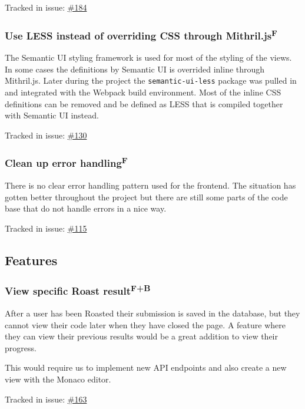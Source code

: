 \documentclass[12pt,a4paper]{report}
\begin{document}
Tracked in issue: \href{https://github.com/LuleaUniversityOfTechnology/2018-project-roaster/issues/184}{\#184}

\subsubsection{Use LESS instead of overriding CSS through Mithril.js\texorpdfstring{\textsuperscript{F}}{}}
The Semantic UI styling framework is used for most of the styling of the views. In some cases the definitions by Semantic UI is overrided inline through Mithril.js. Later during the project the \texttt{semantic-ui-less} package was pulled in and integrated with the Webpack build environment. Most of the inline CSS definitions can be removed and be defined as LESS that is compiled together with Semantic UI instead.

Tracked in issue: \href{https://github.com/LuleaUniversityOfTechnology/2018-project-roaster/issues/130}{\#130}

\subsubsection{Clean up error handling\texorpdfstring{\textsuperscript{F}}{}}
There is no clear error handling pattern used for the frontend. The situation has gotten better throughout the project but there are still some parts of the code base that do not handle errors in a nice way.

Tracked in issue: \href{https://github.com/LuleaUniversityOfTechnology/2018-project-roaster/issues/115}{\#115}

\subsection*{Features}
\subsubsection{View specific Roast result\texorpdfstring{\textsuperscript{F+B}}{}}
After a user has been Roasted their submission is saved in the database, but they cannot view their code later when they have closed the page. A feature where they can view their previous results would be a great addition to view their progress.

This would require us to implement new API endpoints and also create a new view with the Monaco editor.

Tracked in issue: \href{https://github.com/LuleaUniversityOfTechnology/2018-project-roaster/issues/163}{\#163}
\end{document}
